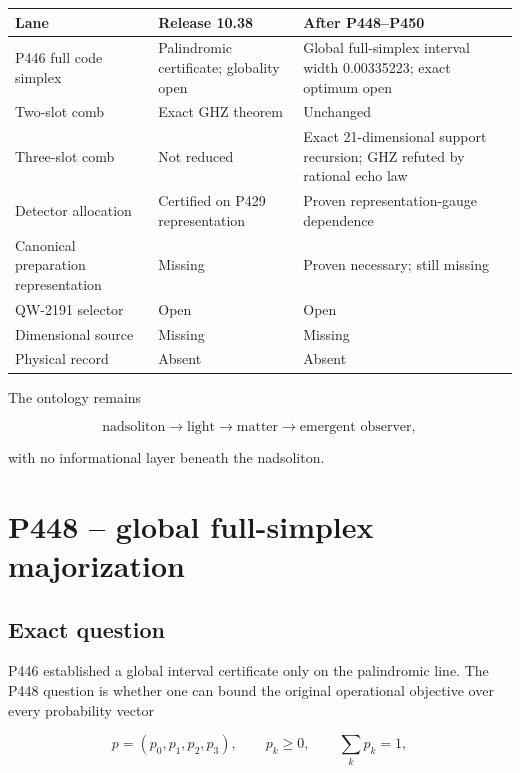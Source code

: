 \documentclass[11pt,a4paper,openany]{report}
\begin{document}
\begin{center}
\begingroup\small
\setlength{\tabcolsep}{2.5pt}
\renewcommand{\arraystretch}{1.16}
\begin{longtable}{@{}p{}p{}p{}@{}}
\toprule
\textbf{Lane} & \textbf{Release 10.38} & \textbf{After P448--P450} \\
\midrule
\endhead
P446 full code simplex & Palindromic certificate; globality open & Global full-simplex interval width 0.00335223; exact optimum open \\
Two-slot comb & Exact GHZ theorem & Unchanged \\
Three-slot comb & Not reduced & Exact 21-dimensional support recursion; GHZ refuted by rational echo law \\
Detector allocation & Certified on P429 representation & Proven representation-gauge dependence \\
Canonical preparation representation & Missing & Proven necessary; still missing \\
QW-2191 selector & Open & Open \\
Dimensional source & Missing & Missing \\
Physical record & Absent & Absent \\
\bottomrule
\end{longtable}
\endgroup
\end{center}

The ontology remains

\[
\text{nadsoliton}
\longrightarrow\text{light}
\longrightarrow\text{matter}
\longrightarrow\text{emergent observer},
\]

with no informational layer beneath the nadsoliton.

\chapter{P448 -- global full-simplex majorization}

\section{Exact question}

P446 established a global interval certificate only on the palindromic line. The P448 question is whether one can bound the original operational objective over every probability vector

\[
p=(p_0,p_1,p_2,p_3),
\qquad p_k\ge0,
\qquad\sum_kp_k=1,
\]
\end{document}
